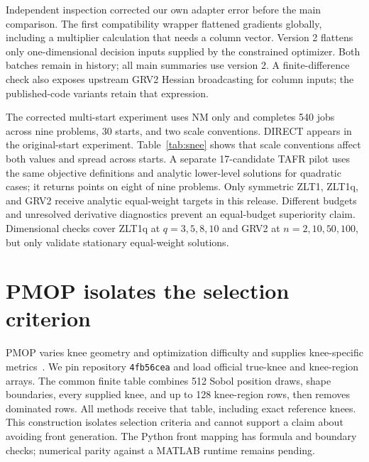 \documentclass[11pt]{article}
\begin{document}
Independent inspection corrected our own adapter error before the main comparison.
The first compatibility wrapper flattened gradients globally, including a multiplier calculation that needs a column vector.
Version 2 flattens only one-dimensional decision inputs supplied by the constrained optimizer.
Both batches remain in history; all main summaries use version 2.
A finite-difference check also exposes upstream GRV2 Hessian broadcasting for column inputs; the published-code variants retain that expression.
\begin{table}[htbp]\centering\small
\caption{MCF median [Q1, Q3] over 30 paired starts. Each scale convention defines its own MCF.}\label{tab:snee}\end{table}

The corrected multi-start experiment uses NM only and completes 540 jobs across nine problems, 30 starts, and two scale conventions. DIRECT appears in the original-start experiment.
Table~\ref{tab:snee} shows that scale conventions affect both values and spread across starts.
A separate 17-candidate TAFR pilot uses the same objective definitions and analytic lower-level solutions for quadratic cases; it returns points on eight of nine problems.
Only symmetric ZLT1, ZLT1q, and GRV2 receive analytic equal-weight targets in this release.
Different budgets and unresolved derivative diagnostics prevent an equal-budget superiority claim.
Dimensional checks cover ZLT1q at $q=3,5,8,10$ and GRV2 at $n=2,10,50,100$, but only validate stationary equal-weight solutions.

\section{PMOP isolates the selection criterion}\label{sec:pmop}
PMOP varies knee geometry and optimization difficulty and supplies knee-specific metrics~\cite{pmop,pmopcode}.
We pin repository \texttt{4fb56cea} and load official true-knee and knee-region arrays.
The common finite table combines 512 Sobol position draws, shape boundaries, every supplied knee, and up to 128 knee-region rows, then removes dominated rows.
All methods receive that table, including exact reference knees.
This construction isolates selection criteria and cannot support a claim about avoiding front generation.
The Python front mapping has formula and boundary checks; numerical parity against a MATLAB runtime remains pending.
\end{document}
